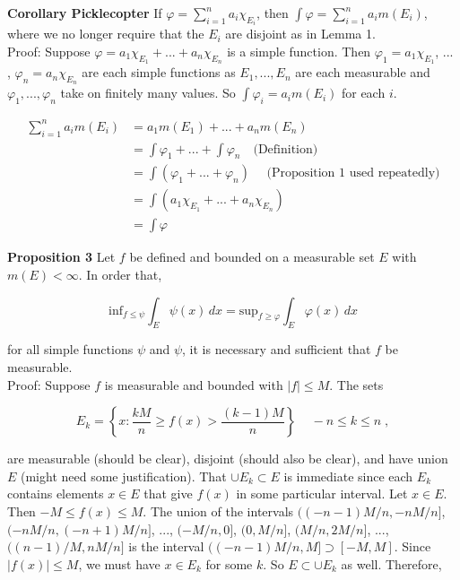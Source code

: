 \documentclass[a4paper]{article}
\begin{document}
{\bf Corollary Picklecopter} If $\varphi = \sum_{i=1}^n a_i \chi_{E_i}$, then $\int \varphi = \sum_{i=1}^n a_i m(E_i)$, where we no longer require that the $E_i$ are disjoint as in Lemma 1. \\

Proof: Suppose $\varphi = a_1\chi_{E_1} + ... + a_n\chi_{E_n}$ is a simple function. Then $\varphi_1 = a_1\chi_{E_1}$, ... , $\varphi_n = a_n \chi_{E_n}$ are each simple functions as $E_1, ... ,E_n$ are each measurable and $\varphi_1, ..., \varphi_n$ take on finitely many values. So $\int \varphi_i = a_im(E_i)$ for each $i$.  

\begin{align*}
\sum_{i=1}^n a_i m(E_i) &= a_1m(E_1) + ... + a_n m(E_n) \\
&= \int \varphi_1  + ... + \int \varphi_n \quad \text{(Definition)}\\
&= \int \left(\varphi_1 + ... + \varphi_n\right) \quad \text{ (Proposition 1 used repeatedly)} \\
&= \int \left(a_1 \chi_{E_1} + ... + a_n \chi_{E_n} \right) \\
&= \int \varphi 
\end{align*}


{\bf Proposition 3} Let $f$ be defined and bounded on a measurable set $E$ with $m(E) < \infty$. In order that,

$$ \text{inf}_{f \leq \psi} \int_{E} \psi(x) \, dx = \text{sup}_{f\geq \varphi} \int_{E} \varphi(x) \, dx $$

for all simple functions $\psi$ and $\psi$, it is necessary and sufficient that $f$ be measurable. \\

Proof: Suppose $f$ is measurable and bounded with $|f| \leq M$. The sets

$$E_k = \left\{ x : \frac{kM}{n} \geq f(x) > \frac{(k-1)M}{n}\right\}\, \quad -n \leq k \leq n \;, $$

are measurable (should be clear), disjoint (should also be clear), and have union $E$ (might need some justification). That $\cup E_k \subset E$ is immediate since each $E_k$ contains elements $x \in E$ that give $f(x)$ in some particular interval. Let $x \in E$. Then $-M \leq f(x) \leq M$. The union of the intervals $((-n-1)M/n, -nM/n]$, $(-nM/n, (-n+1)M/n]$, ..., $(-M/n, 0]$, $(0, M/n]$, $(M/n, 2M/n]$, ..., $((n-1)/M, nM/n]$ is the interval $((-n-1)M/n, M] \supset [-M,M]$. Since $|f(x)| \leq M$, we must have $x \in E_k$ for some $k$. So $E \subset \cup E_k$ as well. Therefore,
\end{document}
